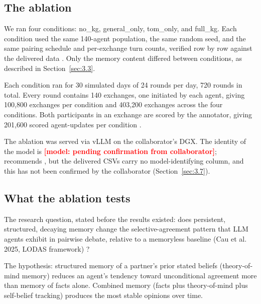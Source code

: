 \documentclass[11pt,a4paper]{article}
\newcommand{\pending}[1]{\textcolor{red}{\textbf{[#1]}}}
\newcommand{\src}[1]{\unskip\marginpar{\raggedright\tiny\textcolor{gray}{#1}}}
\newcommand{\src}[1]{\unskip}
\newcommand{\cond}[1]{\textsf{#1}}
\begin{document}
\subsection{The ablation}\label{sec:4.1}

We ran four conditions: \cond{no\_kg}, \cond{general\_only}, \cond{tom\_only}, and \cond{full\_kg}. Each condition used the same 140-agent population, the same random seed, and the same pairing schedule and per-exchange turn counts, verified row by row against the delivered data \src{R: full\_ablation\_summary.md, Section 1}. Only the memory content differed between conditions, as described in Section~\ref{sec:3.3}.

Each condition ran for 30 simulated days of 24 rounds per day, 720 rounds in total. Every round contains 140 exchanges, one initiated by each agent, giving 100,800 exchanges per condition and 403,200 exchanges across the four conditions. Both participants in an exchange are scored by the annotator, giving 201,600 scored agent-updates per condition \src{R: full\_ablation\_summary.md, Section 1}.

The ablation was served via vLLM on the collaborator's DGX. The identity of the model is \pending{model: pending confirmation from collaborator};  recommends , but the delivered CSVs carry no model-identifying column, and this has not been confirmed by the collaborator (Section~\ref{sec:3.7}).

\subsection{What the ablation tests}\label{sec:4.2}

The research question, stated before the results existed: does persistent, structured, decaying memory change the selective-agreement pattern that LLM agents exhibit in pairwise debate, relative to a memoryless baseline (Cau et al. 2025, LODAS framework) \citep{cau2025selective}?

The hypothesis: structured memory of a partner's prior stated beliefs (theory-of-mind memory) reduces an agent's tendency toward unconditional agreement more than memory of facts alone. Combined memory (facts plus theory-of-mind plus self-belief tracking) produces the most stable opinions over time.
\end{document}
